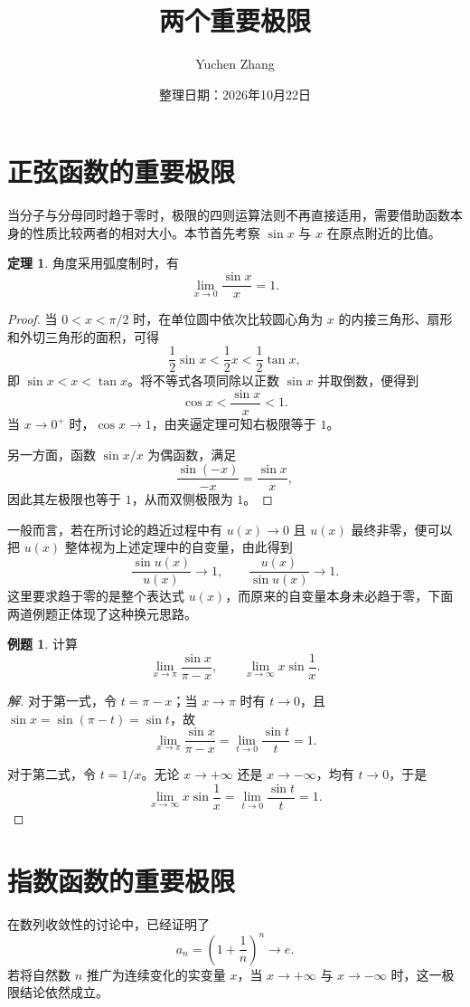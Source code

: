 \documentclass[UTF8,fontset=fandol,a4paper,12pt]{ctexart}
\title{两个重要极限}
\author{Yuchen Zhang}
\date{整理日期：2026年10月22日}
\makeatletter
\theoremstyle{definition}
\newtheorem*{theorem}{定理}
\newtheorem*{example}{例题}
\renewcommand{\maketitle}{\begin{center}
{\LARGE\bfseries \@title\par}\vspace{0.6em}
\@author\par\vspace{0.2em}{\small\@date\par}
\end{center}}
\makeatother
\begin{document}
\maketitle

\section{正弦函数的重要极限}
当分子与分母同时趋于零时，极限的四则运算法则不再直接适用，需要借助函数本身的性质比较两者的相对大小。本节首先考察 $\sin x$ 与 $x$ 在原点附近的比值。

\begin{theorem}
角度采用弧度制时，有
\[
 \boxed{\lim_{x\to0}\frac{\sin x}{x}=1.}
\]
\end{theorem}
\begin{proof}
当 $0<x<\pi/2$ 时，在单位圆中依次比较圆心角为 $x$ 的内接三角形、扇形和外切三角形的面积，可得
\[
 \frac12\sin x<\frac12x<\frac12\tan x,
\]
即 $\sin x<x<\tan x$。将不等式各项同除以正数 $\sin x$ 并取倒数，便得到
\[
 \cos x<\frac{\sin x}{x}<1.
\]
当 $x\to0^+$ 时，$\cos x\to1$，由夹逼定理可知右极限等于 $1$。

另一方面，函数 $\sin x/x$ 为偶函数，满足
\[
 \frac{\sin(-x)}{-x}=\frac{\sin x}{x},
\]
因此其左极限也等于 $1$，从而双侧极限为 $1$。
\end{proof}

一般而言，若在所讨论的趋近过程中有 $u(x)\to0$ 且 $u(x)$ 最终非零，便可以把 $u(x)$ 整体视为上述定理中的自变量，由此得到
\[
 \frac{\sin u(x)}{u(x)}\to1,\qquad
 \frac{u(x)}{\sin u(x)}\to1.
\]
这里要求趋于零的是整个表达式 $u(x)$，而原来的自变量本身未必趋于零，下面两道例题正体现了这种换元思路。

\begin{example}
计算
\[
 \lim_{x\to\pi}\frac{\sin x}{\pi-x},\qquad
 \lim_{x\to\infty}x\sin\frac1x.
\]
\end{example}
\begin{proof}[解]
对于第一式，令 $t=\pi-x$；当 $x\to\pi$ 时有 $t\to0$，且 $\sin x=\sin(\pi-t)=\sin t$，故
\[
 \lim_{x\to\pi}\frac{\sin x}{\pi-x}
 =\lim_{t\to0}\frac{\sin t}{t}=1.
\]

对于第二式，令 $t=1/x$。无论 $x\to+\infty$ 还是 $x\to-\infty$，均有 $t\to0$，于是
\[
 \lim_{x\to\infty}x\sin\frac1x
 =\lim_{t\to0}\frac{\sin t}{t}=1.
\]
\end{proof}

\section{指数函数的重要极限}
在数列收敛性的讨论中，已经证明了
\[
 a_n=\left(1+\frac1n\right)^n\longrightarrow e.
\]
若将自然数 $n$ 推广为连续变化的实变量 $x$，当 $x\to+\infty$ 与 $x\to-\infty$ 时，这一极限结论依然成立。
\end{document}

